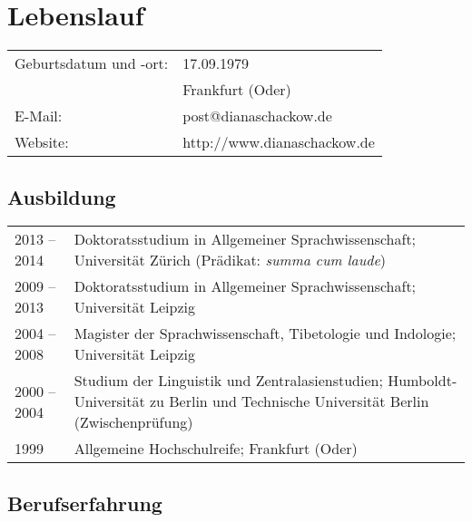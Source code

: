 
\chapter*{Lebenslauf}
\thispagestyle{empty}
\pagestyle{empty}

\parindent0pt


\begin{tabular}{@{}ll}

Geburtsdatum und -ort:&		17.09.1979\\
&							Frankfurt (Oder)\\
E-Mail:&					post@dianaschackow.de\\
Website:&					http://www.dianaschackow.de\\
\end{tabular}


\section*{Ausbildung}

\begin{tabularx}{\textwidth}{@{}p{9em}X}
2013 – 2014& Doktoratsstudium in Allgemeiner Sprachwissenschaft; Universität Zürich (Prädikat: \emph{summa cum laude})\\
2009 –  2013&	Doktoratsstudium in Allgemeiner Sprachwissenschaft; Universität Leipzig\\
2004 – 2008&	Magister der Sprachwissenschaft, Tibetologie und Indologie; Universität Leipzig\\
2000 – 2004&	Studium der Linguistik und Zentralasienstudien; Humboldt-Universität zu Berlin und Technische Universität Berlin (Zwischenprüfung)\\
1999&				Allgemeine Hochschulreife; Frankfurt (Oder) \\
\end{tabularx}


\section*{Berufserfahrung}

